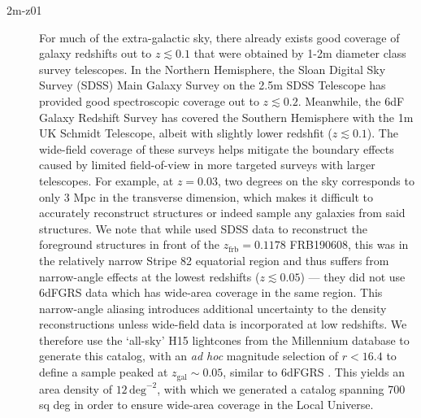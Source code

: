 \documentclass[twocolumn]{aastex63}
\newcommand{\zgal}{\ensuremath{z_\mathrm{gal}}}
\newcommand{\zfrb}{\ensuremath{z_\mathrm{frb}}}
\newcommand{\persqdeg}{\ensuremath{\mathrm{deg}^{-2}}}
\begin{document}
\begin{CJK*}{UTF8}{gbsn}
\begin{description}
\item[\hspace{20pt} \MakeLowercase{2m-z01}]
 For much of the extra-galactic sky, there already exists good coverage of galaxy redshifts out to $z\lesssim 0.1$ 
that were obtained by 1-2m diameter class survey telescopes. In the 
Northern Hemisphere, the Sloan Digital Sky Survey (SDSS) Main Galaxy Survey \citep{abazajian:2009, blanton:2005a} on the 2.5m SDSS Telescope \citep{gunn:2006} has provided good spectroscopic coverage out to $z\lesssim 0.2$. 
Meanwhile, the 6dF Galaxy Redshift Survey \citep[6dFGRS, ][]{jones:2009} has covered the Southern Hemisphere with the 1m UK Schmidt Telescope, albeit with slightly lower redshfit ($z \lesssim 0.1$). The wide-field coverage of these surveys helps mitigate the boundary effects caused by limited field-of-view in more targeted surveys with larger telescopes. For example, at $z=0.03$, two degrees on the sky corresponds to only 3 Mpc in the transverse dimension, which makes it difficult to accurately reconstruct structures or indeed sample any galaxies from said structures. We note that while \citet{simha:2020}
used SDSS data to reconstruct the foreground structures in front of the $\zfrb = 0.1178$ FRB190608, this was in the relatively narrow Stripe 82 equatorial region 
and thus suffers from narrow-angle effects at the lowest redshifts ($z \lesssim 0.05$) --- they did not use 6dFGRS data which has wide-area coverage in the 
same region.
This narrow-angle aliasing introduces additional uncertainty to the density reconstructions unless wide-field data is incorporated at low redshifts. 
We therefore use the `all-sky' H15 lightcones from the Millennium database to generate this catalog, with an \textit{ad hoc} magnitude selection of $r<16.4$ to define a sample peaked at $\zgal \sim 0.05$, similar to 6dFGRS \citep{jones:2009}. This yields an area density of $12\,\persqdeg$, with which we generated a catalog spanning 700 sq deg in order to ensure wide-area coverage in the Local Universe.


\end{description}
\end{CJK*}
\end{document}
